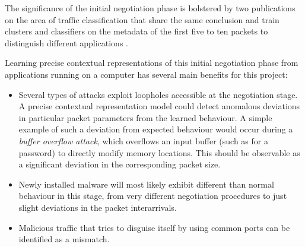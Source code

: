 \documentclass[a4paper,12pt,twoside]{article}
\begin{document}
The significance of the initial negotiation phase is bolstered by two publications on the area of traffic classification that share the same conclusion and train clusters and classifiers on the metadata of the first five to ten packets to distinguish different applications \cite{bernaille2006traffic,crotti2007traffic}.

Learning precise contextual representations of this initial negotiation phase from applications running on a computer has several main benefits for this project: 

\begin{itemize}
\item Several types of attacks exploit loopholes accessible at the negotiation stage. A precise contextual representation model could detect anomalous deviations in particular packet parameters from the learned behaviour. A simple example of such a deviation from expected behaviour would occur during a \textit{buffer overflow attack}, which overflows an input buffer (such as for a password) to directly modify memory locations. This should be observable as a significant deviation in the corresponding packet size.

\item Newly installed malware will most likely exhibit different than normal behaviour in this stage, from very different negotiation procedures to just slight deviations in the packet interarrivals.


\item Malicious traffic that tries to disguise itself by using common ports can be identified as a mismatch.


\end{itemize}
\end{document}

